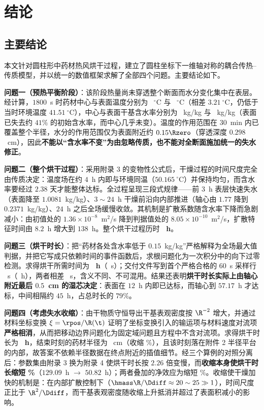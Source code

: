 \section{结论}

\subsection{主要结论}

本文针对圆柱形中药材热风烘干过程，建立了圆柱坐标下一维轴对称的耦合传热--传质模型，并以统一的数值框架求解了全部四个问题。主要结论如下。

\textbf{问题一（预热平衡阶段）}：该阶段热量尚未穿透整个断面而水分变化集中在表层。经计算，$1800$~s 时药材中心与表面温度分别为 \QOneCenterT~$^\circ$C 与 \QOneSurfaceT~$^\circ$C（相差 $3.21~^\circ$C，仍低于当时环境温度 $41.51~^\circ$C），中心与表面干基含水率分别为 \QOneCenterC~kg/kg 与 \QOneSurfaceC~kg/kg（表面已失去约 $41\%$ 的初始含水率，而中心几乎未变）。温度的作用范围在 $30$~min 内已覆盖整个半径，水分的作用范围仅为表面附近约 $0.15\Rzero$（穿透深度 $0.298$~cm），因此\textbf{不能以``含水率不变''为由忽略传质，也不能对全断面施加统一的失水修正}。

\textbf{问题二（整个烘干过程）}：采用附录 3 的变物性公式后，干燥过程的时间尺度完全由传质决定：温度场在约 $4$~h 内即与环境同温（$50.165~^\circ$C）并保持均匀，而含水率要经过 $2.38$ 天才能整体达标。全过程呈现三段式规律——前 $3$~h 表层快速失水（表面降至 $1.0081$~kg/kg）、$3\sim24$~h 干燥前沿向内部推进（轴心由 $1.77$ 降到 $0.2371$~kg/kg）、$24$~h 之后全场缓慢收敛。其机制是扩散系数随含水率下降而急剧减小：由初值处的 $1.36\times10^{-8}$~m$^2$/s 降到判据值处的 $8.05\times10^{-10}$~m$^2$/s，扩散特征时间由 $8.2$~h 增大到 $138$~h。整个烘干过程历时 \textbf{\QTwoEventH~h}。

\textbf{问题三（烘干时长）}：把``药材各处含水率低于 $0.15$~kg/kg''严格解释为全场最大值判据，并把它写成只依赖时间的事件函数后，求根问题化为一次积分中的向下过零检测。求得烘干所需时间为 \textbf{\QThreeEventH~h}（\QThreeEventS~s）；交付文件写到首个严格合格的 $60$~s 采样行 \QThreeLastRowS~s（\QThreeLastRowH~h），两者相差 \QThreeGap~s，含义不同、不可混用。结果还表明\textbf{烘干时长实际上由轴心附近最后 $0.5$~cm 的湿芯决定}：表面在 $12$~h 内即已达标，而轴心到 $57.17$~h 才达标，中间相隔约 $45$~h，占总时长的 $79\%$。

\textbf{问题四（考虑失水收缩）}：由干物质守恒导出干基表观密度按 ${\R}^{-2}$ 增大，并通过材料坐标变换 $\xi=\rpos/\R(\t)$ 证明了坐标变换引入的输运项与材料速度对流项\textbf{严格相消}，从而把移动边界问题化为固定域问题且方程中不含对流项。求得烘干时长为 \textbf{\QFourEventH~h}，结束时刻的药材半径为 \QFourEventR~cm（收缩 \QFourShrinkPct\%），且该时刻落在附件 2 半径平台的内部，故答案不依赖半径数据在终点附近的插值细节。经三个算例的对照分离后：参数集由附录 3 换为附录 4 使烘干时长按 $2.26$ 倍变慢，而\textbf{收缩本身使烘干时长缩短 \QFourShrinkEffectPct\%}（$129.09$~h $\to$ $50.82$~h）；两者叠加的净效应为缩短 \QFourNetEffectPct\%。收缩使干燥加快的机制是：在内部扩散控制下（$\hmass\R/\Ddiff\approx20\sim25\gg1$），时间尺度正比于 ${\R}^2/\Ddiff$，而干基表观密度随收缩上升抵消并超过了表面积减小的影响。

